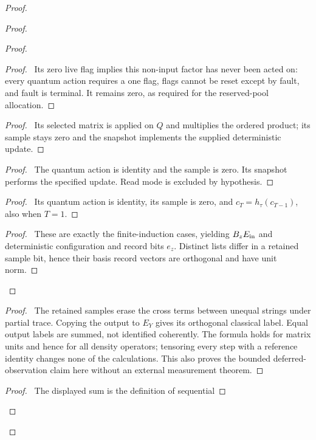 \begin{proof}
\begin{proof}
\begin{proof}
 \begin{proof}\pf\ Its zero live flag implies this non-input
 factor has never been acted on: every quantum action requires a
 one flag, flags cannot be reset except by fault, and fault is
 terminal. It remains zero, as required for the reserved-pool
 allocation.\end{proof}
 \begin{proof}\pf\ Its selected matrix is applied on $Q$ and
 multiplies the ordered product; its sample stays zero and the
 snapshot implements the supplied deterministic update.\end{proof}
 \begin{proof}\pf\ The quantum action is identity and the sample
 is zero. Its snapshot performs the specified update. Read mode
 is excluded by hypothesis.\end{proof}
 \begin{proof}\pf\ Its quantum action is identity, its sample is
 zero, and $c_T=h_\tau(c_{T-1})$, also when $T=1$.\end{proof}
 \qedstep
 \begin{proof}\pf\ These are exactly the finite-induction cases,
 yielding $B_zE_{\rm in}$ and deterministic configuration and record
 bits $e_z$. Distinct lists differ in a retained sample bit, hence
 their basis record vectors are orthogonal and have unit norm.
 \end{proof}
\end{proof}
  \begin{proof}\pf\ The retained samples erase the cross terms
  between unequal strings under partial trace. Copying the output to
  $E_Y$ gives its orthogonal classical label. Equal output labels are
  summed, not identified coherently. The formula holds for matrix
  units and hence for all density operators; tensoring every step
  with a reference identity changes none of the calculations.
  This also proves the bounded deferred-observation claim here
  without an external measurement theorem.\end{proof}
  \qedstep
  \begin{proof}\pf\ The displayed sum is the definition of sequential

\end{proof}
\end{proof}
\end{proof}
